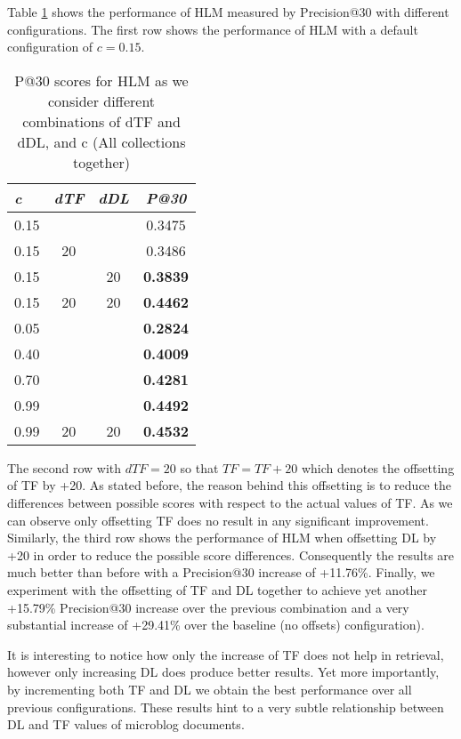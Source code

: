 Table \ref{hlmOverestimates} shows the performance of HLM measured by Precision@30 with different configurations. The first row shows the performance of HLM with a default configuration of $c = 0.15$. 

\begin{table}[]

	\caption{P@30 scores for HLM as we consider different combinations of dTF and dDL, and c (All collections together)}
	\centering
	\begin{tabular}{l|c|c|c} 	
	\textit{\textbf{c}} & 
	\textit{\textbf{dTF}} & 
	\textit{\textbf{dDL}} & 
	\textit{\textbf{P@30}} 	
	\tabularnewline
	\hline
	0.15 &    &    & 0.3475\\
	0.15 & 20 &    & 0.3486\\
	0.15 &    & 20 & \textbf{0.3839} \\
	0.15 & 20 & 20 & \textbf{0.4462} \\
	\hline
	\hline
	0.05 &  &  & \textbf{0.2824} \\
	0.40 &  &  & \textbf{0.4009} \\
	0.70 &  &  & \textbf{0.4281} \\
	0.99 &  &  & \textbf{0.4492} \\
	\hline
    \hline
	0.99 & 20 & 20 & \textbf{0.4532} \\	
	\hline
	\end{tabular}
	\label{hlmOverestimates}
\end{table}

The second row with $dTF = 20$ so that $TF = TF+20$ which denotes the offsetting of TF by +20. As stated before, the reason behind this offsetting is to reduce the differences between possible scores with respect to the actual values of TF. As we can observe only offsetting TF does no result in any significant improvement. Similarly, the third row shows the performance of HLM when offsetting DL by +20 in order to reduce the possible score differences. Consequently the results are much better than before with a Precision@30 increase of +11.76\%. Finally, we experiment with the offsetting of TF and DL together to achieve yet another +15.79\% Precision@30 increase over the previous combination and a very substantial increase of +29.41\% over the baseline (no offsets) configuration). 

It is interesting to notice how only the increase of TF does not help in retrieval, however only increasing DL does produce better results. Yet more importantly, by incrementing both TF and DL we obtain the best performance over all previous configurations. These results hint to a very subtle relationship between DL and TF values of microblog documents. 

